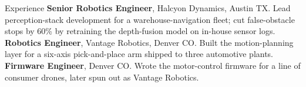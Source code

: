\begin{rubric}{Experience}
\entry*[2021--Present]
  \textbf{Senior Robotics Engineer}, Halcyon Dynamics, Austin TX. Lead
  perception-stack development for a warehouse-navigation fleet; cut
  false-obstacle stops by 60\% by retraining the depth-fusion model on
  in-house sensor logs.
\entry*[2018--2021]
  \textbf{Robotics Engineer}, Vantage Robotics, Denver CO. Built the
  motion-planning layer for a six-axis pick-and-place arm shipped to three
  automotive plants.
\entry*[2016--2018]
  \textbf{Firmware Engineer}, Denver CO. Wrote the motor-control firmware
  for a line of consumer drones, later spun out as Vantage Robotics.
\end{rubric}
